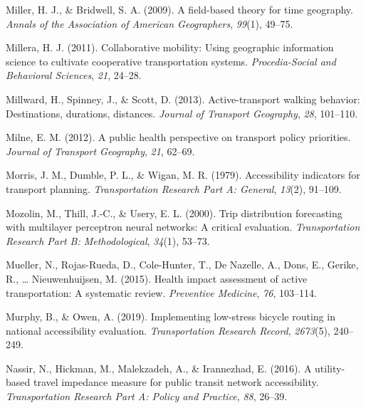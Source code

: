 \documentclass[
11pt, %
oneside, %
english, %
singlespacing, %
]{macthesis} %
\newlength{\cslhangindent}
\newenvironment{CSLReferences}[2] %
 {%
  \setlength{\parindent}{0pt}
  \ifodd #1 \everypar{\setlength{\hangindent}{\cslhangindent}}\ignorespaces\fi
  \ifnum #2 > 0
  \setlength{\parskip}{#2\baselineskip}
  \fi
 }%
 {}
\begin{document}
\begin{CSLReferences}{1}{0}
\leavevmode{}%
Miller, H. J., \& Bridwell, S. A. (2009). A field-based theory for time geography. \emph{Annals of the Association of American Geographers}, \emph{99}(1), 49--75.

\leavevmode{}%
Millera, H. J. (2011). Collaborative mobility: Using geographic information science to cultivate cooperative transportation systems. \emph{Procedia-Social and Behavioral Sciences}, \emph{21}, 24--28.

\leavevmode{}%
Millward, H., Spinney, J., \& Scott, D. (2013). Active-transport walking behavior: Destinations, durations, distances. \emph{Journal of Transport Geography}, \emph{28}, 101--110.

\leavevmode{}%
Milne, E. M. (2012). A public health perspective on transport policy priorities. \emph{Journal of Transport Geography}, \emph{21}, 62--69.

\leavevmode{}%
Morris, J. M., Dumble, P. L., \& Wigan, M. R. (1979). Accessibility indicators for transport planning. \emph{Transportation Research Part A: General}, \emph{13}(2), 91--109.

\leavevmode{}%
Mozolin, M., Thill, J.-C., \& Usery, E. L. (2000). Trip distribution forecasting with multilayer perceptron neural networks: A critical evaluation. \emph{Transportation Research Part B: Methodological}, \emph{34}(1), 53--73.

\leavevmode{}%
Mueller, N., Rojas-Rueda, D., Cole-Hunter, T., De Nazelle, A., Dons, E., Gerike, R., \ldots{} Nieuwenhuijsen, M. (2015). Health impact assessment of active transportation: A systematic review. \emph{Preventive Medicine}, \emph{76}, 103--114.

\leavevmode{}%
Murphy, B., \& Owen, A. (2019). Implementing low-stress bicycle routing in national accessibility evaluation. \emph{Transportation Research Record}, \emph{2673}(5), 240--249.

\leavevmode{}%
Nassir, N., Hickman, M., Malekzadeh, A., \& Irannezhad, E. (2016). A utility-based travel impedance measure for public transit network accessibility. \emph{Transportation Research Part A: Policy and Practice}, \emph{88}, 26--39.


\end{CSLReferences}
\end{document}
